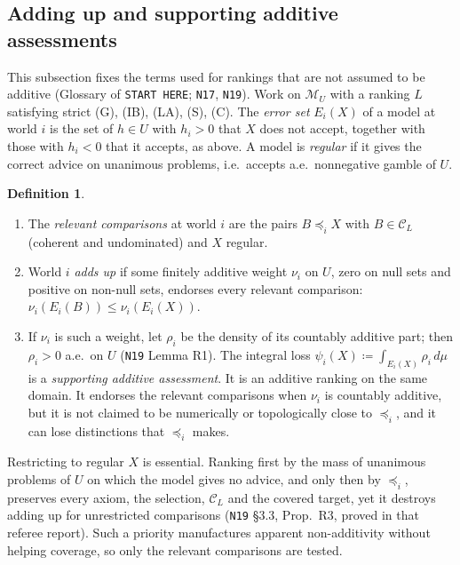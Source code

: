\documentclass[11pt]{article}
\theoremstyle{definition}
\newtheorem{definition}[theorem]{Definition}
\theoremstyle{remark}
\newcommand{\M}{\mathcal M}
\newcommand{\C}{\mathcal C}
\newcommand{\src}[1]{\texttt{#1}}
\begin{document}
\subsection{Adding up and supporting additive assessments}\label{sec:addup-def}
This subsection fixes the terms used for rankings that are not assumed to be additive (Glossary of \src{START HERE}; \src{N17}, \src{N19}). Work on $\M_U$ with a ranking $L$ satisfying strict (G), (IB), (LA), (S), (C). The \emph{error set} $E_i(X)$ of a model at world $i$ is the set of $h\in U$ with $h_i>0$ that $X$ does not accept, together with those with $h_i<0$ that it accepts, as above. A model is \emph{regular} if it gives the correct advice on unanimous problems, i.e.\ accepts a.e.\ nonnegative gamble of $U$.

\begin{definition}\label{def:addup}
\begin{enumerate}[leftmargin=*,label=(\alph*)]
\item The \emph{relevant comparisons} at world $i$ are the pairs $B\preceq_iX$ with $B\in\C_L$ (coherent and undominated) and $X$ regular.
\item World $i$ \emph{adds up} if some finitely additive weight $\nu_i$ on $U$, zero on null sets and positive on non-null sets, endorses every relevant comparison: $\nu_i(E_i(B))\le\nu_i(E_i(X))$.
\item If $\nu_i$ is such a weight, let $\rho_i$ be the density of its countably additive part; then $\rho_i>0$ a.e.\ on $U$ (\src{N19} Lemma R1). The integral loss $\psi_i(X)\coloneqq\int_{E_i(X)}\rho_i\,d\mu$ is a \emph{supporting additive assessment}. It is an additive ranking on the same domain. It endorses the relevant comparisons when $\nu_i$ is countably additive, but it is not claimed to be numerically or topologically close to $\preceq_i$, and it can lose distinctions that $\preceq_i$ makes.
\end{enumerate}
\end{definition}

Restricting to regular $X$ is essential. Ranking first by the mass of unanimous problems of $U$ on which the model gives no advice, and only then by $\preceq_i$, preserves every axiom, the selection, $\C_L$ and the covered target, yet it destroys adding up for unrestricted comparisons (\src{N19} \S3.3, Prop.~R3, proved in that referee report). Such a priority manufactures apparent non-additivity without helping coverage, so only the relevant comparisons are tested.
\end{document}
